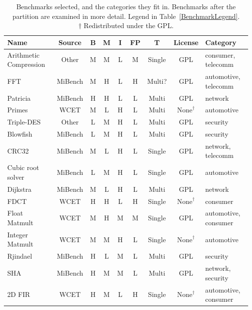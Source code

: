 \documentclass[twocolumn]{article}
\begin{document}
\begin{table}[th!]
\centering
	\begin{tabular}{l c c c c c c c l}
	Name				 	& Source 	& B & M & I & FP& T 		& License & Category \\
	\hline
	Arithmetic Compression	& Other		& M & M & L & M & Single 	& GPL	& consumer, telecomm	\\
	FFT						& MiBench 	& M & H & L & H & Multi?	& GPL	& automotive, telecomm	\\
	Patricia				& MiBench 	& H & H & L & L & Multi 	& GPL	& network	\\
	Primes					& WCET 		& M & L & H & L & Multi 	& $\textrm{None}^\dagger$	& automotive	\\
	Triple-DES				& Other	 	& L & M & H & L & Multi 	& GPL	& security	\\
	\hline
	Blowfish				& MiBench 	& L & M & H & L & Multi 	& GPL	& security	\\
	CRC32					& MiBench 	& M & L & H & L & Single 	& GPL	& network, telecomm	\\
	Cubic root solver		& MiBench 	& L & M & H & L & Single 	& GPL	& automotive	\\
	Dijkstra				& MiBench 	& M & L & H & L & Multi 	& GPL	& network	\\
	FDCT					& WCET 		& H & H & L & H & Single 	& $\textrm{None}^\dagger$	& consumer	\\
	Float Matmult			& WCET 		& M & H & M & M & Single 	& GPL	& automotive, consumer	\\
	Integer Matmult			& WCET	 	& M & M & H & L & Single 	& $\textrm{None}^\dagger$	& automotive	\\
	Rjindael				& MiBench 	& H & L & M & L & Multi 	& GPL	& security	\\
	SHA						& MiBench 	& H & M & M & L & Multi 	& GPL	& network, security	\\
	2D FIR					& WCET 		& H & M & L & H & Single 	& $\textrm{None}^\dagger$	& automotive, consumer	\\
	\end{tabular}
\caption{Benchmarks selected, and the categories they fit in. Benchmarks after the partition are examined in more detail. Legend in Table~\ref{BenchmarkLegend}. \\[-0.8em]
 {\null\hfill\scriptsize $\dagger$ Redistributed under the GPL.\hspace{2cm}\null}
 }
\label{Table:BenchmarkTable}
\end{table}
\end{document}
